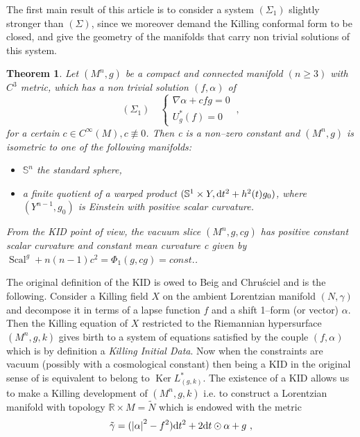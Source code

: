 \documentclass[a4paper,11pt,leqno]{amsart}
\numberwithin{equation}{section}
\theoremstyle{main}
\newtheorem{thm} {\bf  Theorem} [section]
\begin{document}
The first main result of this article is to consider a system $(\Sigma_1)$ slightly stronger than $(\Sigma)$, since we moreover demand the Killing conformal form to be closed, and give the geometry of the manifolds that carry non trivial solutions of this system.
\begin{thm}\label{KID}
Let $(M^n, g)$ be a compact and connected manifold $(n\ge 3)$ with $C^3$ metric, which has a non trivial solution $(f,\alpha)$ of
$$(\Sigma_1)\quad \left\{
\begin{array}{l}
	 \nabla\alpha+ cfg= 0 \\
	 U_g^* (f)=0
\end{array}\right. \ ,$$
for a certain $c\in C^{\infty}(M), c\not\equiv 0$. Then c is a non--zero constant and $(M^n, g)$ is isometric to one of the following manifolds:
\begin{itemize}
	\item[(i)] ${{\mathbb S^{n}}}$ the standard sphere,
	\item[(ii)] a finite quotient  of a warped product $(\mathbb S^1 \times Y, {{\rm d}} t^2 + h^2 (t)g_0)$, where $(Y^{n-1},g_0)$ is Einstein with positive scalar curvature.
\end{itemize}
From the KID point of view, the vacuum slice $(M^n, g, cg)$ has positive constant scalar curvature and constant mean curvature c given by ${\operatorname{Scal}}^g +n(n-1)c^2= \Phi_1(g,cg)=const.$.
\end{thm}
The original definition of the KID is owed to Beig and Chru\'sciel \cite{BCh} and is the following. Consider a Killing field $X$ on the ambient Lorentzian manifold $(N,\gamma)$ and decompose it in terms of a lapse function $f$ and a shift 1--form (or vector) $\alpha$. Then the Killing equation of $X$ restricted to the Riemannian hypersurface $(M^n,g,k)$ gives birth to a system of equations satisfied by the couple $(f,\alpha)$ which is by definition a \textit{Killing Initial Data}. Now when the constraints are vacuum (possibly with a cosmological constant) then being a KID in the original sense of \cite{BCh} is equivalent to belong to ${\operatorname{Ker}} L^*_{(g,k)}$. The existence of a KID allows us to make a Killing development of $(M^n,g,k)$ i.e. to construct a Lorentzian manifold with topology ${{\mathbb R}}\times M=\tilde{N}$ which is endowed with the metric
$$ \tilde{\gamma}= (\left|\alpha\right|^2-f^2){{\rm d}} t^2 +  2 {{\rm d}} t\odot \alpha + g \ ,$$ 
\end{document}
